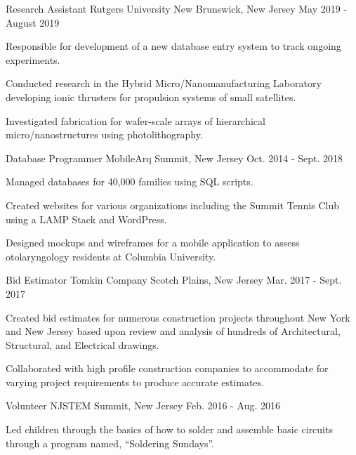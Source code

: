 \begin{cventries}
  \cventry
    {Research Assistant}
    {Rutgers University}
    {New Brunswick, New Jersey}
    {May 2019 - August 2019}
    {
      \begin{cvitems}
        \item {Responsible for development of a new database entry system to track ongoing experiments.}
        \item {Conducted research in the Hybrid Micro/Nanomanufacturing Laboratory developing ionic thrusters for propulsion systems of small satellites.}
        \item {Investigated fabrication for wafer-scale arrays of hierarchical micro/nanostructures using photolithography.}
      \end{cvitems}
    }
  \cventry
    {Database Programmer}
    {MobileArq}
    {Summit, New Jersey}
    {Oct. 2014 - Sept. 2018}
    {
      \begin{cvitems}
        \item {Managed databases for 40,000 families using SQL scripts.}
        \item {Created websites for various organizations including the Summit Tennis Club using a LAMP Stack and WordPress.} 
        \item {Designed mockups and wireframes for a mobile application to assess otolaryngology residents at Columbia University.}
      \end{cvitems}
    }
  \cventry
    {Bid Estimator}
    {Tomkin Company}
    {Scotch Plains, New Jersey}
    {Mar. 2017 - Sept. 2017}
    {
      \begin{cvitems}
        \item {Created bid estimates for numerous construction projects throughout New York and New Jersey based upon review and analysis of hundreds of Architectural, Structural, and Electrical drawings.}
        \item {Collaborated with high profile construction companies to accommodate for varying project requirements to produce accurate estimates.}
      \end{cvitems}
    }
  \cventry
    {Volunteer}
    {NJSTEM}
    {Summit, New Jersey}
    {Feb. 2016 - Aug. 2016}
    {
      \begin{cvitems}
        \item {Led children through the basics of how to solder and assemble basic circuits through a program named, “Soldering Sundays”.}
      \end{cvitems}
    }
    \vspace{-2mm}

    
\end{cventries}
